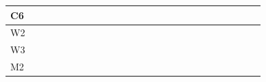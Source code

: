 \documentclass[journal,onecolumn]{IEEEtran}
\begin{document}
\begin{table}[ht]
\begin{tabular}{|l|llllll|llllll|llllll|llllll|}
C6   &                          &                          &                          &                          &                          &                          &                          &                          &                          &                          &                          &                          &                          &                          &                          &                          &                          &                          &                          & \cellcolor[HTML]{414868} &                          &                          &                          &  \\ \hline
W2   &                          &                          &                          &                          &                          &                          &                          &                          &                          &                          &                          &                          &                          &                          &                          &                          &                          &                          &                          & \cellcolor[HTML]{414868} & \cellcolor[HTML]{414868} &                          &                          &  \\ \hline
W3   &                          &                          &                          &                          &                          &                          &                          &                          &                          &                          &                          &                          &                          &                          &                          &                          &                          &                          &                          &                          & \cellcolor[HTML]{414868} & \cellcolor[HTML]{414868} &                          &  \\ \hline
M2   &                          &                          &                          &                          &                          &                          &                          &                          &                          &                          &                          &                          &                          &                          &                          &                          &                          &                          &                          &                          &                          &                          & \cellcolor[HTML]{7AA2F7} &  \\ \hline

\end{tabular}
\end{table}
\end{document}
